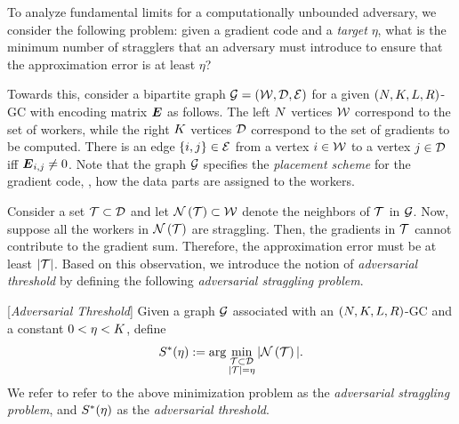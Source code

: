 \documentclass[conference,letterpaper]{IEEEtran}
\begin{document}
To analyze fundamental limits 
for a computationally unbounded adversary, 
we consider the following problem: given a gradient code and a {\it target} $\eta$, what is the minimum number of stragglers that an adversary must introduce to ensure that the approximation error is at least $\eta$? %



Towards this, consider a bipartite graph $\mathcal{G} = (\mathcal{W},\mathcal{D},\mathcal{E})$ for a given  $(N,K,L,R)$-GC with encoding matrix $\boldsymbol{E}$ as follows. The left $N$ vertices $\mathcal{W}$ correspond to the set of workers, while the right $K$ vertices $\mathcal{D}$ correspond to the set of gradients to be computed. There is an edge $\{i,j\}\in\mathcal{E}$ from a vertex $i\in\mathcal{W}$ to a vertex $j\in\mathcal{D}$ iff $\boldsymbol{E}_{i,j} \ne 0$. Note that the graph $\mathcal{G}$ specifies the {\it placement scheme} for the gradient code, \ie, how the data parts are assigned to the workers.

Consider a set $\mathcal{T}\subset{\mathcal{D}}$ and let $\mathcal{N}\left(\mathcal{T}\right)\subset\mathcal{W}$ denote the neighbors of $\mathcal{T}$ in $\mathcal{G}$. Now, suppose all the workers in $\mathcal{N}\left(\mathcal{T}\right)$ are straggling. Then, the gradients in $\mathcal{T}$ cannot contribute to the gradient sum. Therefore, the approximation error must be at least $|\mathcal{T}|$. Based on this observation, we introduce the notion of {\it adversarial threshold} by defining the following {\it adversarial straggling problem}. 

\begin{definition}
\label{def:adversarial-threshold}
[{\it Adversarial Threshold}]
Given a graph $\mathcal{G}$ associated with an $(N,K,L,R)$-GC and a constant $0 < \eta < K$, define
\begin{equation}
    \label{eq:S-star}
     S^{*}(\eta) : = \arg\min_{\substack{\mathcal{T}\subset \mathcal{D}\\ |\mathcal{T}| = \eta}} |\mathcal{N}\left(\mathcal{T}\right)|.
\end{equation}
We refer to refer to the above minimization problem as the {\it adversarial straggling problem}, and $S^{*}(\eta)$ as the {\it adversarial threshold}.
\end{definition}
\end{document}
